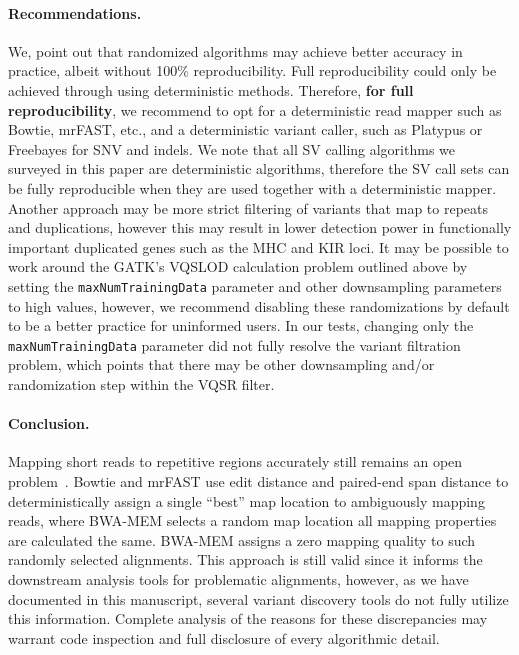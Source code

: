 \documentclass{bioinfo}
\begin{document}
\paragraph{Recommendations.}
We, point out that randomized algorithms may achieve better accuracy in practice, albeit without 100\% reproducibility.
 Full reproducibility could only be achieved through using deterministic methods. Therefore, {\bf for full reproducibility}, 
we recommend to opt for a deterministic read mapper such as Bowtie, mrFAST, etc., and a deterministic
variant caller, such as Platypus or Freebayes for SNV and indels. We note that all SV calling algorithms we surveyed in this paper are deterministic algorithms, therefore the SV call sets can be fully reproducible when they are used together with a deterministic mapper. 
Another approach may be more strict filtering of variants that map to repeats and duplications, however this may result in lower detection power in functionally important duplicated genes such as the MHC and KIR loci.
 It may be possible to work around the GATK's VQSLOD calculation problem outlined above by setting the {\tt maxNumTrainingData} parameter and other downsampling parameters to high values, however, we recommend disabling these randomizations by default to be a better practice for uninformed users. In our tests, changing only the {\tt maxNumTrainingData} parameter did not fully resolve the variant filtration problem, which points that there may be other downsampling and/or randomization step within the VQSR filter. 


\paragraph{Conclusion.}

Mapping short reads to repetitive regions accurately still remains an open problem~\citep{Treangen2012}. Bowtie and mrFAST use 
edit distance and paired-end span distance 
to deterministically assign a single ``best'' map location to ambiguously mapping reads, where BWA-MEM selects a random map location all mapping properties are calculated the same. BWA-MEM assigns a zero mapping quality
to such randomly selected alignments. This approach is still valid since it informs the downstream analysis tools for problematic alignments, however, as we have documented in this manuscript, 
several variant discovery tools do not fully utilize this information. Complete analysis of the reasons for these discrepancies may warrant code inspection and full disclosure of every algorithmic detail.
\end{document}
